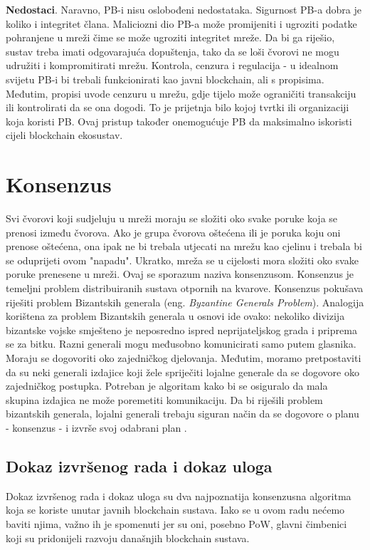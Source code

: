 \documentclass[times, utf8, diplomski]{fer}
\begin{document}
\textbf{Nedostaci}. Naravno, PB-i nisu oslobođeni nedostataka. Sigurnost PB-a dobra je koliko i integritet člana. Maliciozni dio PB-a može promijeniti i ugroziti podatke pohranjene u mreži čime se može ugroziti integritet mreže. Da bi ga riješio, sustav treba imati odgovarajuća dopuštenja, tako da se loši čvorovi ne mogu udružiti i kompromitirati mrežu. Kontrola, cenzura i regulacija - u idealnom svijetu PB-i bi trebali funkcionirati kao javni blockchain, ali s propisima. Međutim, propisi uvode cenzuru u mrežu, gdje tijelo može ograničiti transakciju ili kontrolirati da se ona dogodi. To je prijetnja bilo kojoj tvrtki ili organizaciji koja koristi PB. Ovaj pristup također onemogućuje PB da maksimalno iskoristi cijeli blockchain ekosustav.

\section{Konsenzus}
Svi čvorovi koji sudjeluju u mreži moraju se složiti oko svake poruke koja se prenosi između čvorova. Ako je grupa čvorova oštećena ili je poruka koju oni prenose oštećena, ona ipak ne bi trebala utjecati na mrežu kao cjelinu i trebala bi se oduprijeti ovom "napadu". Ukratko, mreža se u cijelosti mora složiti oko svake poruke prenesene u mreži. Ovaj se sporazum naziva konsenzusom. Konsenzus je temeljni problem distribuiranih sustava otpornih na kvarove. Konsenzus pokušava riješiti problem Bizantskih generala (eng.  \textit{Byzantine Generals Problem}).  Analogija korištena za problem Bizantskih generala u osnovi ide ovako: nekoliko divizija bizantske vojske smješteno je neposredno ispred neprijateljskog grada i priprema se za bitku. Razni generali mogu međusobno komunicirati samo putem glasnika. Moraju se dogovoriti oko zajedničkog djelovanja. Međutim, moramo pretpostaviti da su neki generali izdajice koji žele spriječiti lojalne generale da se dogovore oko zajedničkog postupka. Potreban je algoritam kako bi se osiguralo da mala skupina izdajica ne može poremetiti komunikaciju. Da bi riješili problem bizantskih generala, lojalni generali trebaju siguran način da se dogovore o planu - konsenzus - i izvrše svoj odabrani plan \cite{impossibility}.

\subsection{Dokaz izvršenog rada i dokaz uloga}
Dokaz izvršenog rada i dokaz uloga su dva najpoznatija konsenzusna algoritma koja se koriste unutar javnih blockchain sustava. Iako se u ovom radu nećemo baviti njima, važno ih je spomenuti jer su oni, posebno PoW, glavni čimbenici koji su pridonijeli razvoju današnjih blockchain sustava.
\end{document}

